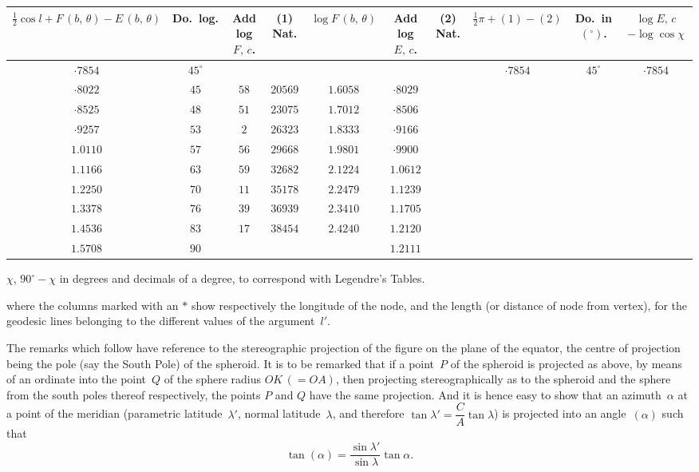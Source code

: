 \documentclass[11pt,a4paper]{article}
\theoremstyle{plain}
\theoremstyle{definition}
\begin{document}
\begin{center}
\small
\begin{tabular}{c|c|c|c|c|c|c|c|c|c}
\toprule
\parbox{0.8cm}{\centering $\tfrac{1}{2}\cos l + F\,(b,\,\theta) - E\,(b,\,\theta)$} &
\parbox{0.8cm}{\centering Do.\ log.} &
\parbox{0.8cm}{\centering Add log $F,\,c$.} &
\parbox{0.8cm}{\centering (1) Nat.} &
\parbox{1cm}{\centering $\log F\,(b,\,\theta)$} &
\parbox{0.8cm}{\centering Add log $E,\,c$.} &
\parbox{0.8cm}{\centering (2) Nat.} &
\parbox{1cm}{\centering $\tfrac{1}{2}\pi+(1)-(2)$} &
\parbox{0.8cm}{\centering Do.\ in $(^\circ)$.} &
\parbox{1cm}{\centering $\log E,\,c$ $-\log\cos\chi$} \\
\midrule
$\cdot 7854$ & $45^\circ$ & & & & & & $\cdot 7854$ & $45^\circ$ & $\cdot 7854$ \\
$\cdot 8022$ & $45$  & $58$ & $20569$ & $1.6058$ & $\cdot 8029$ & & & & \\
$\cdot 8525$ & $48$  & $51$ & $23075$ & $1.7012$ & $\cdot 8506$ & & & & \\
$\cdot 9257$ & $53$  & $2$  & $26323$ & $1.8333$ & $\cdot 9166$ & & & & \\
$1.0110$    & $57$  & $56$ & $29668$ & $1.9801$ & $\cdot 9900$ & & & & \\
$1.1166$    & $63$  & $59$ & $32682$ & $2.1224$ & $1.0612$ & & & & \\
$1.2250$    & $70$  & $11$ & $35178$ & $2.2479$ & $1.1239$ & & & & \\
$1.3378$    & $76$  & $39$ & $36939$ & $2.3410$ & $1.1705$ & & & & \\
$1.4536$    & $83$  & $17$ & $38454$ & $2.4240$ & $1.2120$ & & & & \\
$1.5708$    & $90$  &      &         &          & $1.2111$ & & & & \\
\bottomrule
\end{tabular}
\end{center}

$\chi$, $90^\circ-\chi$ in degrees and decimals of a degree, to correspond with Legendre's Tables.

where the columns marked with an $*$ show respectively the longitude of the node,
and the length (or distance of node from vertex), for the geodesic lines belonging to
the different values of the argument~$l'$.

\clearpage

The remarks which follow have reference to the stereographic projection of the
figure on the plane of the equator, the centre of projection being the pole (say the
South Pole) of the spheroid.  It is to be remarked that if a point~$P$ of the spheroid
is projected as above, by means of an ordinate into the point~$Q$ of the sphere radius
$OK\,(=OA)$, then projecting stereographically as to the spheroid and the sphere from
the south poles thereof respectively, the points $P$ and $Q$ have the same projection.
And it is hence easy to show that an azimuth~$\alpha$ at a point of the meridian (parametric
latitude~$\lambda'$, normal latitude~$\lambda$, and therefore $\tan\lambda' = \dfrac{C}{A}\tan\lambda$) is projected
into an angle~$(\alpha)$ such that
\[
\tan{(\alpha)} = \frac{\sin\lambda'}{\sin\lambda}\tan\alpha.
\]
\end{document}
